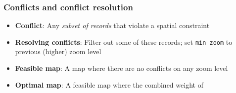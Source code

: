 \documentclass{beamer}
\begin{document}
\frame
{
  \frametitle{Conflicts and conflict resolution}
  \begin{itemize}
  \item \textbf{Conflict}: Any \emph{subset of records} that violate a spatial constraint
  \item \textbf{Resolving conflicts}: Filter out some of these records; set \texttt{min\_zoom} to previous (higher) zoom level
  \item \textbf{Feasible map}: A map where there are no conflicts on any zoom level
  \item \textbf{Optimal map}: A feasible map where the combined weight of 
\end{itemize}}
\end{document}
